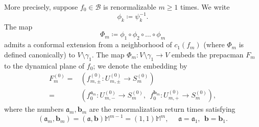 \documentclass{amsart}
\renewcommand{\sp}{{\ \ }}
\newcommand{\1}{{\mathbb 1 }}
\renewcommand{\aa}{\mathfrak{a}}
\newcommand{\bb}{{\mathbf b}}
\newcommand\BB{\mathcal{B}}
\theoremstyle{remark}
\numberwithin{equation}{section}
\theoremstyle{definition}
\theoremstyle{nonumberbreak}
\begin{document}
More precisely, suppose $f_0\in \BB$ is renormalizable $m\ge 1$ times. We write
\[\phi_k\coloneqq \psi_k^{-1}.\]
The map 
\[ \Phi_{m} \coloneqq \phi_{1}\circ \phi_{2}\circ \dots\circ \phi_{m}\] 
admits a conformal extension from a neighborhood of $c_1(f_m)$ (where $\Phi_{m}$ is defined canonically) to $V\setminus \gamma_1$. The map $\Phi_{m}\colon V\setminus \gamma_1 \to V$ embeds the prepacman $F_m$ to the dynamical plane of $f_0$; we denote the embedding by 
\begin{align*}
 F^{(0)}_m= &\left(f^{(0)}_{m,\pm }\colon U^{(0)}_{m,\pm}\to S_{m}^{(0)}\right)\\=& \left(f^{\aa_{m}}_{0}\colon U^{(0)}_{m,-}\to S_{m}^{(0)}, \sp f^{\bb_{m}}_{0}\colon U^{(0)}_{m,+}\to S_{m}^{(0)}\right),
\end{align*}
where the numbers $\aa_{m}, \bb_{m}$ are the renormalization return times satisfying
\begin{equation}
\left(
         \aa_m, \bb_m
        \right) = \left(
         \aa , \bb
       \right) \mathbb M^{m-1} =\left(
         1 ,1
        \right)\mathbb M^{m}, \sp\sp\sp \aa=\aa_1,\sp\bb=\bb_1.
\end{equation} 

        
        
\end{document}
